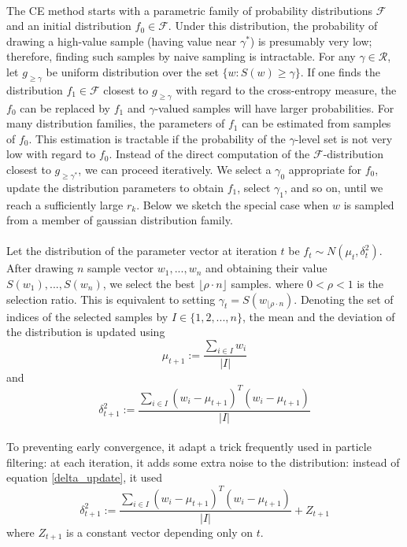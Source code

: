 \documentclass[12pt,a4paper]{article}
\begin{document}
\paragraph{}The CE method starts with a parametric family of probability distributions $\mathcal{F}$ and an initial distribution $f_{0} \in \mathcal{F}$. Under this distribution, the probability of drawing a high-value sample (having value near $\gamma^{*}$) is presumably very low; therefore, finding such samples by naive sampling is intractable. For any $\gamma \in \mathcal{R}$, let $g_{\geq \gamma}$ be uniform distribution over the set $\{w: S(w)\geq \gamma\}$. If one finds the distribution $f_{1} \in \mathcal{F}$ closest to $g_{\geq \gamma}$ with regard to the cross-entropy measure, the $f_{0}$ can be replaced by $f_{1}$ and $\gamma$-valued samples will have larger probabilities. For many distribution families, the parameters of $f_{1}$ can be estimated from samples of $f_{0}$. This estimation is tractable if the probability of the $\gamma$-level set is not very low with regard to $f_{0}$. Instead of the direct computation of the $\mathcal{F}$-distribution closest to $g_{\geq \gamma^{*}}$, we can proceed iteratively. We select a $\gamma_{0}$ appropriate for $f_{0}$, update the distribution parameters to obtain $f_{1}$, select $\gamma_{1}$, and so on, until we reach a sufficiently large $r_{k}$. Below we sketch the special case when $w$ is sampled from a member of gaussian distribution family.
\paragraph{} Let the distribution of the parameter vector at iteration $t$ be $f_{t} \sim N(\mu_{t}, \delta_{t}^{2})$. After drawing $n$ sample vector $w_{1}, ..., w_{n}$ and obtaining their value $S(w_{1}), ..., S(w_{n})$, we select the best $\lfloor \rho \cdot n \rfloor$ samples. where $0<\rho<1$ is the selection ratio. This is equivalent to setting $\gamma_{t} = S(w_{\lfloor \rho \cdot n})$. Denoting the set of indices of the selected samples by $I \in \{1,2, ..., n\}$, the mean and the deviation of  the distribution is updated using
\begin{equation}\label{mu_update}
\mu_{t+1} := \frac{\sum_{i \in I}{}w_{i}}{|I|}
\end{equation}
and
\begin{equation}\label{delta_update}
\delta_{t+1}^{2} := \frac{\sum_{i \in I}{}(w_{i}-\mu_{t+1})^{T}(w_{i}-\mu_{t+1})}{|I|}
\end{equation}
\paragraph{}To preventing early convergence, it adapt a trick frequently used in particle filtering: at each iteration, it adds some extra noise to the distribution: instead of equation \ref{delta_update}, it used 
\begin{equation}\label{delta_update_noise}
\delta_{t+1}^{2} := \frac{\sum_{i \in I}{}(w_{i}-\mu_{t+1})^{T}(w_{i}-\mu_{t+1})}{|I|} + Z_{t+1}
\end{equation}
where $Z_{t+1}$ is a constant vector depending only on $t$.
\ifx\allfiles\undefined


\end{document}
